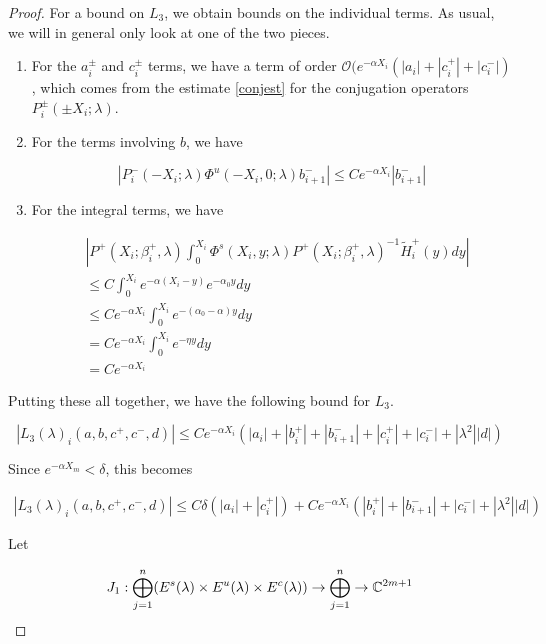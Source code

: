 \documentclass[thesis.tex]{subfiles}
\begin{document}
\begin{lemma}
\begin{proof}
For a bound on $L_3$, we obtain bounds on the individual terms. As usual, we will in general only look at one of the two pieces.

\begin{enumerate}

\item For the $a_i^\pm$ and $c_i^\pm$ terms, we have a term of order $\mathcal{O}(e^{-\alpha X_i}(|a_i| + |c_i^+| + |c_i^-|)$, which comes from the estimate \eqref{conjest} for the conjugation operators $P_i^\pm(\pm X_i; \lambda)$.

\item For the terms involving $b$, we have

\[
| P_i^-(-X_i; \lambda) \Phi^u(-X_i, 0; \lambda) b_{i+1}^-| \leq C e^{-\alpha X_i} |b_{i+1}
^-|
\]

\item For the integral terms, we have

\begin{align*}
&\left|
P^+(X_i; \beta_i^+, \lambda) \int_0^{X_i} \Phi^s(X_i, y; \lambda) P^+(X_i; \beta_i^+, \lambda)^{-1} \tilde{H}_i^+(y) dy \right| \\
&\leq C \int_0^{X_i} e^{-\alpha(X_i - y)}e^{-\alpha_0 y} dy \\
&\leq C e^{-\alpha X_i} \int_0^{X_i} e^{-(\alpha_0 - \alpha)y} dy \\
&= C e^{-\alpha X_i} \int_0^{X_i} e^{-\eta y} dy \\ 
&= C e^{-\alpha X_i}
\end{align*}

\end{enumerate}

Putting these all together, we have the following bound for $L_3$.

\begin{equation}\label{L3bound}
|L_3(\lambda)_i(a, b, c^+, c^-, d)| \leq C e^{-\alpha X_i} \left( |a_i| + |b_i^+| + |b_{i+1}^-| + |c_i^+| + |c_i^-| + |\lambda^2| |d| \right)
\end{equation}

Since $e^{-\alpha X_m} < \delta$, this becomes

\begin{align*}
|L_3(\lambda)_i(a, b, c^+, c^-, d)| \leq C \delta ( |a_i| + |c_i^+| ) + C e^{-\alpha X_i} \left( |b_i^+| + |b_{i+1}^-| + |c_i^-| + |\lambda^2| |d| \right)
\end{align*}

Let 

\[
J_1: \bigoplus_{j=1}^n (E^s(\lambda) \times E^u(
\lambda) \times E^c(\lambda) ) \rightarrow \bigoplus_{j=1}^n \rightarrow {\mathbb C}^{2m+1}
\]


\end{proof}
\end{lemma}
\end{document}
